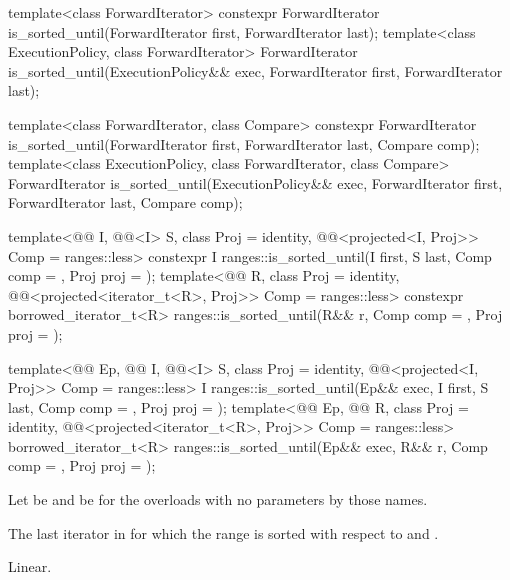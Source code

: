 %
\begin{itemdecl}
template<class ForwardIterator>
  constexpr ForwardIterator
    is_sorted_until(ForwardIterator first, ForwardIterator last);
template<class ExecutionPolicy, class ForwardIterator>
  ForwardIterator
    is_sorted_until(ExecutionPolicy&& exec,
                    ForwardIterator first, ForwardIterator last);

template<class ForwardIterator, class Compare>
  constexpr ForwardIterator
    is_sorted_until(ForwardIterator first, ForwardIterator last,
                    Compare comp);
template<class ExecutionPolicy, class ForwardIterator, class Compare>
  ForwardIterator
    is_sorted_until(ExecutionPolicy&& exec,
                    ForwardIterator first, ForwardIterator last,
                    Compare comp);

template<@@ I, @@<I> S, class Proj = identity,
         @@<projected<I, Proj>> Comp = ranges::less>
  constexpr I ranges::is_sorted_until(I first, S last, Comp comp = {}, Proj proj = {});
template<@@ R, class Proj = identity,
         @@<projected<iterator_t<R>, Proj>> Comp = ranges::less>
  constexpr borrowed_iterator_t<R>
    ranges::is_sorted_until(R&& r, Comp comp = {}, Proj proj = {});

template<@@ Ep, @@ I, @@<I> S,
         class Proj = identity,
         @@<projected<I, Proj>> Comp = ranges::less>
  I ranges::is_sorted_until(Ep&& exec, I first, S last, Comp comp = {},
                    Proj proj = {});
template<@@ Ep, @@ R, class Proj = identity,
         @@<projected<iterator_t<R>, Proj>> Comp = ranges::less>
  borrowed_iterator_t<R>
    ranges::is_sorted_until(Ep&& exec, R&& r, Comp comp = {}, Proj proj = {});
\end{itemdecl}

\begin{itemdescr}
\pnum
Let  be 
and  be 
for the overloads with no parameters by those names.

\pnum
\returns
The last iterator  in 
for which the range 
is sorted with respect to  and .

\pnum
\complexity
Linear.
\end{itemdescr}

